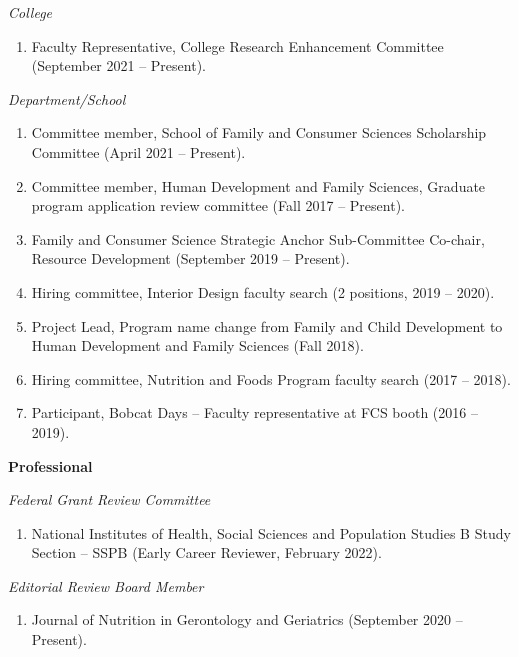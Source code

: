 \documentclass[
]{article}
\providecommand{\tightlist}{%
  \setlength{\itemsep}{0pt}\setlength{\parskip}{0pt}}
\begin{document}
\emph{College}

\begin{enumerate}
\def\labelenumi{\arabic{enumi}.}
\tightlist
\item
  Faculty Representative, College Research Enhancement Committee
  (September 2021 -- Present).
\end{enumerate}

\emph{Department/School}

\begin{enumerate}
\def\labelenumi{\arabic{enumi}.}
\item
  Committee member, School of Family and Consumer Sciences Scholarship
  Committee (April 2021 -- Present).
\item
  Committee member, Human Development and Family Sciences, Graduate
  program application review committee (Fall 2017 -- Present).
\item
  Family and Consumer Science Strategic Anchor Sub-Committee Co-chair,
  Resource Development (September 2019 -- Present).
\item
  Hiring committee, Interior Design faculty search (2 positions, 2019 --
  2020).
\item
  Project Lead, Program name change from Family and Child Development to
  Human Development and Family Sciences (Fall 2018).
\item
  Hiring committee, Nutrition and Foods Program faculty search (2017 --
  2018).
\item
  Participant, Bobcat Days -- Faculty representative at FCS booth (2016
  -- 2019).
\end{enumerate}

\textbf{Professional}

\emph{Federal Grant Review Committee}

\begin{enumerate}
\def\labelenumi{\arabic{enumi}.}
\tightlist
\item
  National Institutes of Health, Social Sciences and Population Studies
  B Study Section -- SSPB (Early Career Reviewer, February 2022).
\end{enumerate}

\emph{Editorial Review Board Member}

\begin{enumerate}
\def\labelenumi{\arabic{enumi}.}
\tightlist
\item
  Journal of Nutrition in Gerontology and Geriatrics (September 2020 --
  Present).
\end{enumerate}
\end{document}
